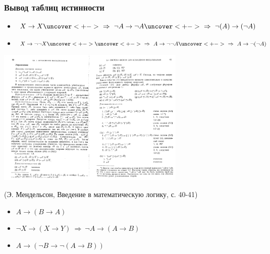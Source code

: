 \documentclass[24pt,pdf,hyperref={unicode}]{beamer}
\begin{document}
\begin{frame}\frametitle{Вывод таблиц истинности}
\begin{itemize}[<+->]
\item $X\rightarrow X \uncover<+->{\ \Rightarrow\ \neg A\rightarrow \neg A} \uncover<+->{\ \Rightarrow\ \neg(A)\rightarrow(\neg A)}$
\item $X\rightarrow \neg\neg X \uncover<+->{}\uncover<+->{\ \Rightarrow\ A\rightarrow \neg\neg A}\uncover<+->{\ \Rightarrow\ A\rightarrow \neg(\neg A)}$
\end{itemize}

{
\begin{center}
\includegraphics[width=9cm]{Mendelson.png}

(Э. Мендельсон, Введение в математическую логику, с. 40-41)
\end{center}
}


\begin{itemize}[<+->]
\item $A\rightarrow(B\rightarrow A)$
\item $\neg X\rightarrow (X\rightarrow Y) {\ \Rightarrow\ \neg A\rightarrow(A\rightarrow B)}$
\item $A\rightarrow(\neg B\rightarrow\neg(A\rightarrow B))$
\end{itemize}
\end{frame}
\end{document}
